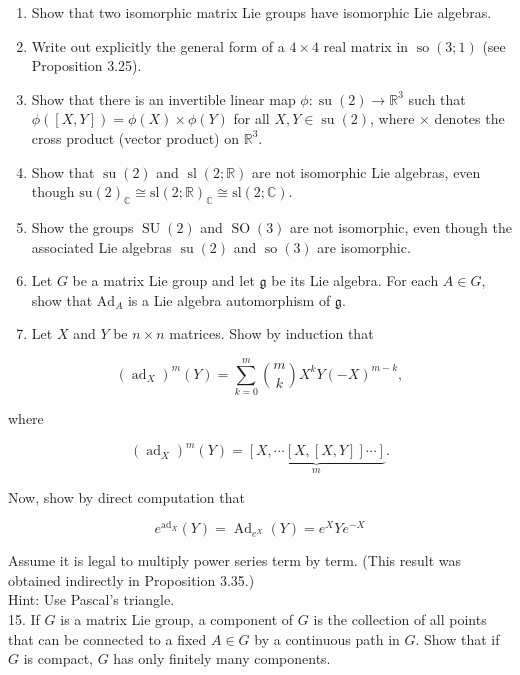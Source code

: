 \documentclass[10pt, letterpaper]{article}
\begin{document}
\begin{enumerate}
  \item Show that two isomorphic matrix Lie groups have isomorphic Lie algebras.
  \item Write out explicitly the general form of a $4 \times 4$ real matrix in $\operatorname{so}(3 ; 1)$ (see Proposition 3.25).
  \item Show that there is an invertible linear map $\phi: \operatorname{su}(2) \rightarrow \mathbb{R}^{3}$ such that $\phi([X, Y])=\phi(X) \times \phi(Y)$ for all $X, Y \in \operatorname{su}(2)$, where $\times$ denotes the cross product (vector product) on $\mathbb{R}^{3}$.
  \item Show that $\operatorname{su}(2)$ and $\operatorname{sl}(2 ; \mathbb{R})$ are not isomorphic Lie algebras, even though $\mathrm{su}(2)_{\mathbb{C}} \cong \mathrm{sl}(2 ; \mathbb{R})_{\mathbb{C}} \cong \mathrm{sl}(2 ; \mathbb{C})$.
  \item Show the groups $\operatorname{SU}(2)$ and $\operatorname{SO}(3)$ are not isomorphic, even though the associated Lie algebras $\operatorname{su}(2)$ and $\operatorname{so}(3)$ are isomorphic.
  \item Let $G$ be a matrix Lie group and let $\mathfrak{g}$ be its Lie algebra. For each $A \in G$, show that $\mathrm{Ad}_{A}$ is a Lie algebra automorphism of $\mathfrak{g}$.
  \item Let $X$ and $Y$ be $n \times n$ matrices. Show by induction that
\end{enumerate}

$$
\left(\operatorname{ad}_{X}\right)^{m}(Y)=\sum_{k=0}^{m}\binom{m}{k} X^{k} Y(-X)^{m-k},
$$

where

$$
\left(\operatorname{ad}_{X}\right)^{m}(Y)=\underbrace{[X, \cdots[X,[X, Y]] \cdots]}_{m} .
$$

Now, show by direct computation that

$$
e^{\mathrm{ad}_{X}}(Y)=\operatorname{Ad}_{e^{X}}(Y)=e^{X} Y e^{-X}
$$

Assume it is legal to multiply power series term by term. (This result was obtained indirectly in Proposition 3.35.)\\
Hint: Use Pascal's triangle.\\
15. If $G$ is a matrix Lie group, a component of $G$ is the collection of all points that can be connected to a fixed $A \in G$ by a continuous path in $G$. Show that if $G$ is compact, $G$ has only finitely many components.
\end{document}

